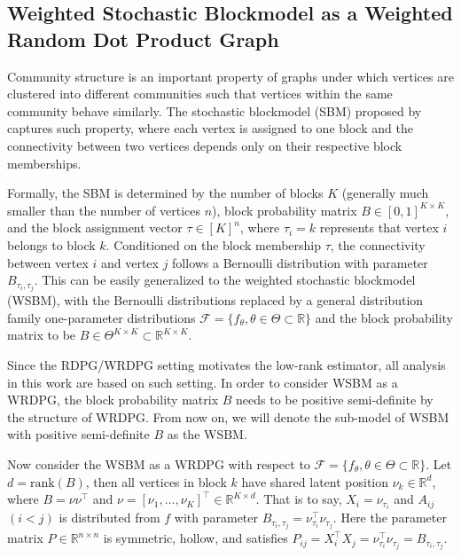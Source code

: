 \documentclass[a4paper]{article}
\begin{document}
\subsection{Weighted Stochastic Blockmodel as a Weighted Random Dot Product Graph}
\label{section:WSBM}

Community structure is an important property of graphs under which vertices are clustered into different communities such that vertices within the same community behave similarly. The stochastic blockmodel (SBM) proposed by \citet{holland1983stochastic} captures such property, where each vertex is assigned to one block and the connectivity between two vertices depends only on their respective block memberships.

Formally, the SBM is determined by the number of blocks $K$ (generally much smaller than the number of vertices $n$), block probability matrix $B \in [0, 1]^{K \times K}$, and the block assignment vector $\tau \in [K]^n$, where $\tau_i = k$ represents that vertex $i$ belongs to block $k$. Conditioned on the block membership $\tau$, the connectivity between vertex $i$ and vertex $j$ follows a Bernoulli distribution with parameter $B_{\tau_i, \tau_j}$. This can be easily generalized to the weighted stochastic blockmodel (WSBM), with the Bernoulli distributions replaced by a general distribution family one-parameter distributions $\mathcal{F} = \{ f_{\theta}, \theta \in \Theta \subset \mathbb{R} \}$ and the block probability matrix to be $B \in \Theta^{K \times K} \subset \mathbb{R}^{K \times K}$.

Since the RDPG/WRDPG setting motivates the low-rank estimator, all analysis in this work are based on such setting. In order to consider WSBM as a WRDPG, the block probability matrix $B$ needs to be positive semi-definite by the structure of WRDPG. From now on, we will denote the sub-model of WSBM with positive semi-definite $B$ as the WSBM.

Now consider the WSBM as a WRDPG with respect to $\mathcal{F} = \{ f_{\theta}, \theta \in \Theta \subset \mathbb{R} \}$. Let $d = 
\mathrm{rank}(B)$, then all vertices in block $k$ have shared latent position $\nu_k \in \mathbb{R}^{d}$, where $B = \nu \nu^{\top}$ and $\nu = [\nu_1, \dotsc, \nu_K]^{\top} \in \mathbb{R}^{K \times d}$. That is to say, $X_i = \nu_{\tau_i}$ and $A_{ij}$ $(i < j)$ is distributed from $f$ with parameter $B_{\tau_i, \tau_j} = \nu_{\tau_i}^{\top} \nu_{\tau_j}$. Here the parameter matrix $P \in \mathbb{R}^{n \times n}$ is symmetric, hollow, and satisfies $P_{ij} = X_i^{\top} X_j = \nu_{\tau_i}^{\top} \nu_{\tau_j} = B_{\tau_i, \tau_j}$.
\end{document}
